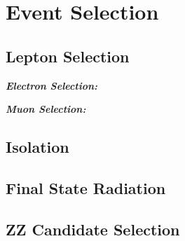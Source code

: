 \section{Event Selection}
\label{sec:evt_sel}

\subsection{Lepton Selection}
\label{subsec:lep_sel}
\textbf{\textit{Electron Selection:}}

\textbf{\textit{Muon Selection:}}

\subsection{Isolation}
\label{subsec:iso}

\subsection{Final State Radiation}
\label{subsec:fsr}

\subsection{ZZ Candidate Selection}
\label{subsec:zz_sel}